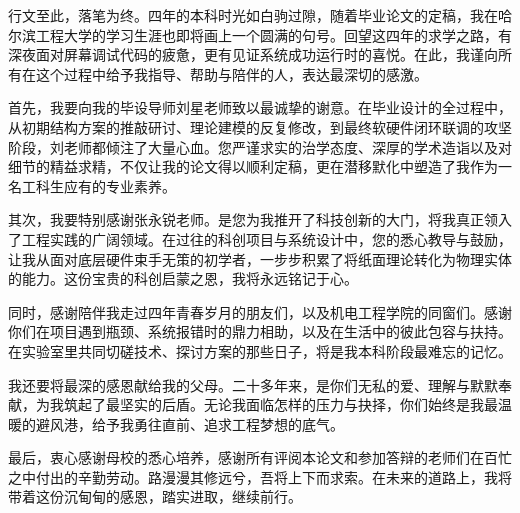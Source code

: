 



行文至此，落笔为终。四年的本科时光如白驹过隙，随着毕业论文的定稿，我在哈尔滨工程大学的学习生涯也即将画上一个圆满的句号。回望这四年的求学之路，有深夜面对屏幕调试代码的疲惫，更有见证系统成功运行时的喜悦。在此，我谨向所有在这个过程中给予我指导、帮助与陪伴的人，表达最深切的感激。

首先，我要向我的毕设导师刘星老师致以最诚挚的谢意。在毕业设计的全过程中，从初期结构方案的推敲研讨、理论建模的反复修改，到最终软硬件闭环联调的攻坚阶段，刘老师都倾注了大量心血。您严谨求实的治学态度、深厚的学术造诣以及对细节的精益求精，不仅让我的论文得以顺利定稿，更在潜移默化中塑造了我作为一名工科生应有的专业素养。

其次，我要特别感谢张永锐老师。是您为我推开了科技创新的大门，将我真正领入了工程实践的广阔领域。在过往的科创项目与系统设计中，您的悉心教导与鼓励，让我从面对底层硬件束手无策的初学者，一步步积累了将纸面理论转化为物理实体的能力。这份宝贵的科创启蒙之恩，我将永远铭记于心。

同时，感谢陪伴我走过四年青春岁月的朋友们，以及机电工程学院的同窗们。感谢你们在项目遇到瓶颈、系统报错时的鼎力相助，以及在生活中的彼此包容与扶持。在实验室里共同切磋技术、探讨方案的那些日子，将是我本科阶段最难忘的记忆。

我还要将最深的感恩献给我的父母。二十多年来，是你们无私的爱、理解与默默奉献，为我筑起了最坚实的后盾。无论我面临怎样的压力与抉择，你们始终是我最温暖的避风港，给予我勇往直前、追求工程梦想的底气。

最后，衷心感谢母校的悉心培养，感谢所有评阅本论文和参加答辩的老师们在百忙之中付出的辛勤劳动。路漫漫其修远兮，吾将上下而求索。在未来的道路上，我将带着这份沉甸甸的感恩，踏实进取，继续前行。
